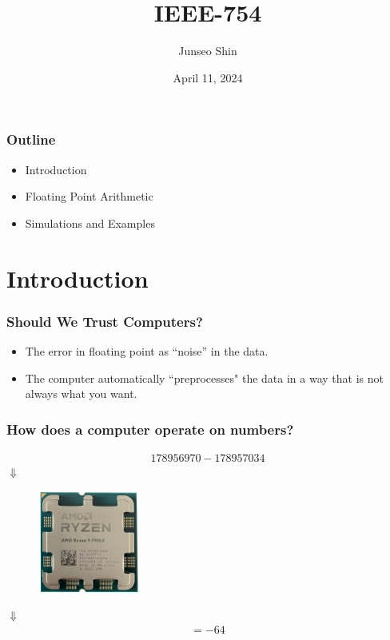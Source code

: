 \documentclass[10pt]{beamer}
\title{IEEE-754}
\author{Junseo Shin}
\date{April 11, 2024}
\begin{document}
\maketitle
\begin{frame}
    \frametitle{Outline}
    \begin{itemize}
        \item Introduction
        \item Floating Point Arithmetic
        \item Simulations and Examples
    \end{itemize}
\end{frame}
\section{Introduction}
\begin{frame}
    \frametitle{Should We Trust Computers?}
    \begin{itemize}
        \item The error in floating point as ``noise'' in the data.
        \item The computer automatically ``preprocesses" the data in a way that is not always what you
        want. 
    \end{itemize}
\end{frame}
\begin{frame}
    \frametitle{How does a computer operate on numbers?}
    \begin{align*}
        178956970 - 178957034  %
    \end{align*} \vspace*{-\baselineskip}\pause
    \center $\Downarrow$
    \begin{figure}
        \centering
        \includegraphics[width=0.3\textwidth]{ryzen9.png}
    \end{figure}
    \vspace*{-\baselineskip}\pause
    $\Downarrow$
    \begin{align*}
        = -64
    \end{align*}
\end{frame}
\end{document}
